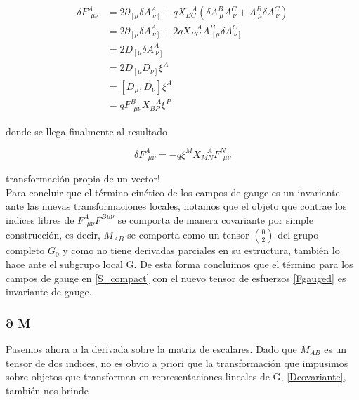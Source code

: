\documentclass{article}
\numberwithin{equation}{section}
\begin{document}
\begin{equation}
\begin{aligned}
\delta F^A_{\ \ \mu \nu} &= 2 \partial_{\left[ \mu\right.} \delta A^A_{\ \left. \nu \right]} + q X_{B C}^{\ \ \ \ A} \left(\delta A^B_{\ \mu} A^C_{\ \nu} + A^B_{\ \mu} \delta  A^C_{\ \nu} \right)\\
&=  2 \partial_{\left[ \mu\right.} \delta A^A_{\ \left. \nu \right]} + 2 q X_{B C}^{\ \ \ \ A} A^B_{\ \left[ \mu \right.} \delta A^C_{\ \left. \nu \right]}\\
&= 2 D_{\left[ \mu \right.} \delta A^A_{\ \left. \nu \right]}\\
&= 2 D_{\left[ \mu \right.} D_{\left. \nu \right]} \xi^A\\
&= \left[D_{\mu}, D_{\nu}\right] \xi^A\\
&= q F^B_{\ \ \mu \nu} X_{B P}^{\ \ \ \ A} \xi^P
\end{aligned}
\end{equation}

donde se llega finalmente al resultado

\begin{equation}
\delta F^A_{\ \  \mu \nu} = -q \xi^M X_{M N}^{\ \ \ \ A} F^N_{\ \ \mu \nu} 
\end{equation}

transformación propia de un vector!\\


Para concluir que el término cinético de los campos de gauge es un invariante ante las nuevas transformaciones locales, notamos que el objeto que contrae los indices libres de $ F^A_{\ \  \mu \nu} F^{B \mu \nu} $ se comporta de manera covariante por simple construcción, es decir, $ M_{A B} $ se comporta como un tensor $ \binom{0}{2} $ del grupo completo $ G_0 $ y como no tiene derivadas parciales en su estructura, también lo hace ante el subgrupo local G. De esta forma concluimos que el término para los campos de gauge en \ref{S_compact} con el nuevo tensor de esfuerzos \ref{Fgauged} es invariante de gauge.\\

\subsubsection{$ \bm{\partial} $ M}

Pasemos ahora a la derivada sobre la matriz de escalares. Dado que $ M_{A B} $ es un tensor de dos indices, no es obvio a priori que la transformación que impusimos sobre objetos que transforman en representaciones lineales de G, \ref{Dcovariante}, también nos brinde
\end{document}
